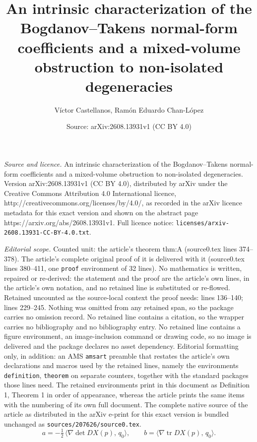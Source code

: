 \documentclass[10pt,a4paper]{amsart}
\title{An intrinsic characterization of the Bogdanov--Takens normal-form coefficients and a mixed-volume obstruction to non-isolated degeneracies}
\author{V\'ictor Castellanos, Ram\'on Eduardo Chan-L\'opez}
\date{Source: arXiv:2608.13931v1 (CC BY 4.0)}
\DeclareMathOperator{\dt}{det}
\newcommand{\ip}[2]{\langle #1,\, #2\rangle}
\newcommand{\tr}{\operatorname{tr}}
\begin{document}
\maketitle

\noindent\emph{Source and licence.} An intrinsic characterization of the Bogdanov--Takens normal-form coefficients and a mixed-volume obstruction to non-isolated degeneracies. Version arXiv:2608.13931v1 (CC BY 4.0), distributed by arXiv under the Creative Commons Attribution 4.0 International licence, http://creativecommons.org/licenses/by/4.0/, as recorded in the arXiv licence metadata for this exact version and shown on the abstract page https://arxiv.org/abs/2608.13931v1. Full licence notice: \texttt{licenses/arxiv-2608.13931-CC-BY-4.0.txt}.\par\smallskip

\noindent\textit{Editorial scope.} Counted unit: the article's theorem thm:A (source0.tex lines 374--378). The article's complete original proof of it is delivered with it (source0.tex lines 380--411, one \texttt{proof} environment of 32 lines). No mathematics is written, repaired or re-derived: the statement and the proof are the article's own lines, in the article's own notation, and no retained line is substituted or re-flowed.  Retained uncounted as the source-local context the proof needs: lines 136--140; lines 229--245.  Nothing was omitted from any retained span, so the package carries no omission record.  No retained line contains a citation, so the wrapper carries no bibliography and no bibliography entry.  No retained line contains a figure environment, an image-inclusion command or drawing code, so no image is delivered and the package declares no asset dependency.  Editorial formatting only, in addition: an AMS \texttt{amsart} preamble that restates the article's own declarations and macros used by the retained lines, namely the environments \texttt{definition}, \texttt{theorem} on separate counters, together with the standard packages those lines need.  The retained environments print in this document as Definition 1, Theorem 1 in order of appearance, whereas the article prints the same items with the numbering of its own full document.  The complete native source of the article as distributed in the arXiv e-print for this exact version is bundled unchanged as \texttt{sources/207626/source0.tex}.
	\begin{equation}\label{eq:ThmA}
		a=-\tfrac12\,\ip{\nabla\!\dt DX(p)}{q_{0}},
		\qquad
		b=\ip{\nabla\!\tr DX(p)}{q_{0}} .
	\end{equation}
\end{document}
